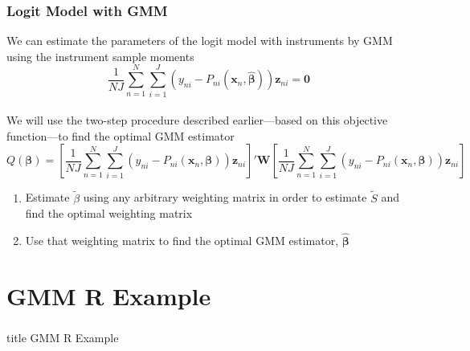 \documentclass{beamer}\usepackage[]{graphicx}\usepackage[]{color}
\begin{document}
\begin{frame}\frametitle{Logit Model with GMM}
    We can estimate the parameters of the logit model with instruments by GMM using the instrument sample moments
    $$\frac{1}{NJ} \sum_{n = 1}^N \sum_{i = 1}^J \left( y_{ni} - P_{ni}(\bm{x}_n, \widehat{\bm{\beta}}) \right) \bm{z}_{ni} = \bm{0}$$ \\
    \vspace{2ex}
    We will use the two-step procedure described earlier---based on this objective function---to find the optimal GMM estimator \\
    \vspace{1ex}
    {\scriptsize $$Q(\bm{\beta}) = \left[ \frac{1}{NJ} \sum_{n = 1}^N \sum_{i = 1}^J \left( y_{ni} - P_{ni}(\bm{x}_n, \bm{\beta}) \right) \bm{z}_{ni} \right]' \bm{W} \left[ \frac{1}{NJ} \sum_{n = 1}^N \sum_{i = 1}^J \left( y_{ni} - P_{ni}(\bm{x}_n, \bm{\beta}) \right) \bm{z}_{ni} \right]$$}
    \begin{enumerate}
    	\item Estimate $\widetilde{\beta}$ using any arbitrary weighting matrix in order to estimate $\widetilde{S}$ and find the optimal weighting matrix
    	\item Use that weighting matrix to find the optimal GMM estimator, $\widehat{\bm{\beta}}$
    \end{enumerate}
\end{frame}

\section{GMM R Example}
\label{example}
\begin{frame}\frametitle{}
    \vfill
    \centering
    \begin{beamercolorbox}[center]{title}
        \Large GMM R Example
    \end{beamercolorbox}
    \vfill
\end{frame}
\end{document}
